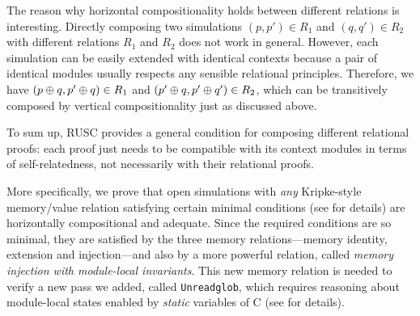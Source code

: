 The reason why horizontal compositionality holds between different
relations is interesting. Directly composing two simulations $(p,p') \in R_1$
and $(q,q') \in R_2$ with different relations $R_1$ and $R_2$
does not work in general. However, each simulation can be easily
extended with identical contexts because a pair of identical modules
usually respects any sensible relational principles. Therefore,
we have $(p \oplus q ,p' \oplus q) \in R_1$ and
$(p' \oplus q ,p' \oplus q') \in R_2$, which can be transitively composed
by vertical compositionality just as discussed above.

To sum up, RUSC provides a general condition for composing
different relational proofs: each proof just needs to be compatible
with its context modules in terms of self-relatedness, not necessarily
with their relational proofs.



%

More specifically, we prove that open simulations with
\emph{any} Kripke-style memory/value relation satisfying certain minimal
conditions (see  for details) are horizontally compositional
and adequate. Since the required conditions are so minimal, they are
satisfied by the three memory relations---memory identity, extension
and injection---and also by a more powerful relation,
called \emph{memory injection with module-local invariants}.
This new memory relation is needed to
verify a new pass we added, called \texttt{Unreadglob}, which
requires reasoning about module-local states enabled by \emph{static}
variables of C (see  for details).

